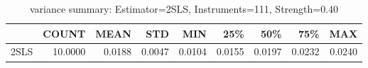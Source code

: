 \begin{table}[ht]
\centering
\caption{variance summary: Estimator=2SLS, Instruments=111, Strength=0.40}
\begin{tabular}{lrrrrrrrr}
\toprule
 & COUNT & MEAN & STD & MIN & 25\% & 50\% & 75\% & MAX \\
\midrule
2SLS & 10.0000 & 0.0188 & 0.0047 & 0.0104 & 0.0155 & 0.0197 & 0.0232 & 0.0240 \\
\bottomrule
\end{tabular}
\end{table}
